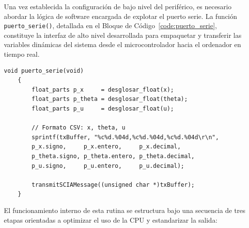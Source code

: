 \documentclass[11pt,fleqn]{book} %
\begin{document}
Una vez establecida la configuración de bajo nivel del periférico, es necesario abordar la lógica de software encargada de explotar el puerto serie. La función \texttt{puerto\_serie()}, detallada en el Bloque de Código~\ref{code:puerto_serie}, constituye la interfaz de alto nivel desarrollada para empaquetar y transferir las variables dinámicas del sistema desde el microcontrolador hacia el ordenador en tiempo real.

\begin{lstlisting}[style=estiloC, caption={Envío de la telemetría vía puerto serie en formato CSV.}, label={code:puerto_serie}]
	void puerto_serie(void)
	{
		float_parts p_x     = desglosar_float(x);
		float_parts p_theta = desglosar_float(theta);
		float_parts p_u     = desglosar_float(u); 
		
		// Formato CSV: x, theta, u
		sprintf(txBuffer, "%c%d.%04d,%c%d.%04d,%c%d.%04d\r\n",
		p_x.signo,     p_x.entero,     p_x.decimal,
		p_theta.signo, p_theta.entero, p_theta.decimal,
		p_u.signo,     p_u.entero,     p_u.decimal);
		
		transmitSCIAMessage((unsigned char *)txBuffer);
	}
\end{lstlisting}

El funcionamiento interno de esta rutina se estructura bajo una secuencia de tres etapas orientadas a optimizar el uso de la CPU y estandarizar la salida:
\end{document}
